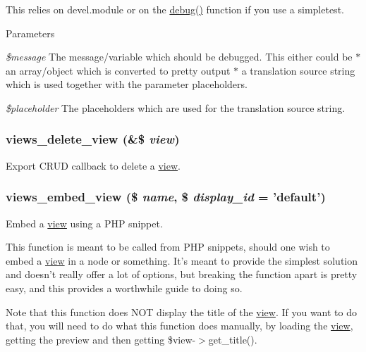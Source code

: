 This relies on devel.module or on the \hyperlink{common_8inc_a008ec6c4681fcb83701755c61daa8050}{debug()} function if you use a simpletest.


\begin{DoxyParams}{Parameters}
\item[{\em \$message}]The message/variable which should be debugged. This either could be $\ast$ an array/object which is converted to pretty output $\ast$ a translation source string which is used together with the parameter placeholders.\item[{\em \$placeholder}]The placeholders which are used for the translation source string. \end{DoxyParams}
\hypertarget{views_8module_a1eeaff33304db50bde3466466d1bfc2d}{
\subsubsection[{views\_\-delete\_\-view}]{\setlength{\rightskip}{0pt plus 5cm}views\_\-delete\_\-view (\&\$ {\em view})}}
\label{views_8module_a1eeaff33304db50bde3466466d1bfc2d}
Export CRUD callback to delete a \hyperlink{classview}{view}. \hypertarget{views_8module_ae8f9f0c72da6982461ec2423eaf88a5a}{
\subsubsection[{views\_\-embed\_\-view}]{\setlength{\rightskip}{0pt plus 5cm}views\_\-embed\_\-view (\$ {\em name}, \/  \$ {\em display\_\-id} = {\ttfamily 'default'})}}
\label{views_8module_ae8f9f0c72da6982461ec2423eaf88a5a}
Embed a \hyperlink{classview}{view} using a PHP snippet.

This function is meant to be called from PHP snippets, should one wish to embed a \hyperlink{classview}{view} in a node or something. It's meant to provide the simplest solution and doesn't really offer a lot of options, but breaking the function apart is pretty easy, and this provides a worthwhile guide to doing so.

Note that this function does NOT display the title of the \hyperlink{classview}{view}. If you want to do that, you will need to do what this function does manually, by loading the \hyperlink{classview}{view}, getting the preview and then getting \$view-\/$>$get\_\-title().


